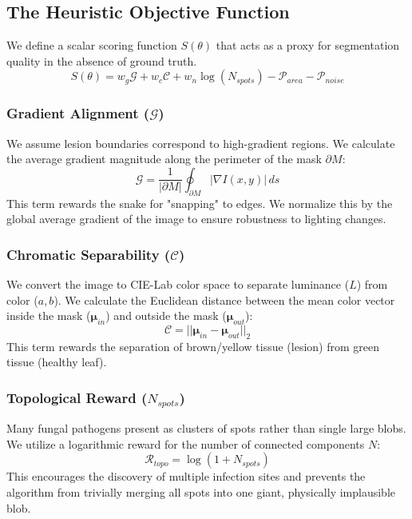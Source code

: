 \documentclass[journal]{IEEEtran}
\begin{document}
\subsection{The Heuristic Objective Function}
We define a scalar scoring function $S(\theta)$ that acts as a proxy for segmentation quality in the absence of ground truth.
\begin{equation}
S(\theta) = w_g \mathcal{G} + w_c \mathcal{C} + w_n \log(N_{spots}) - \mathcal{P}_{area} - \mathcal{P}_{noise}
\end{equation}

\subsubsection{Gradient Alignment ($\mathcal{G}$)}
We assume lesion boundaries correspond to high-gradient regions. We calculate the average gradient magnitude along the perimeter of the mask $\partial M$:
\begin{equation}
\mathcal{G} = \frac{1}{|\partial M|} \oint_{\partial M} |\nabla I(x,y)| \, ds
\end{equation}
This term rewards the snake for "snapping" to edges. We normalize this by the global average gradient of the image to ensure robustness to lighting changes.

\subsubsection{Chromatic Separability ($\mathcal{C}$)}
We convert the image to CIE-Lab color space to separate luminance ($L$) from color ($a, b$). We calculate the Euclidean distance between the mean color vector inside the mask ($\bm{\mu}_{in}$) and outside the mask ($\bm{\mu}_{out}$):
\begin{equation}
\mathcal{C} = || \bm{\mu}_{in} - \bm{\mu}_{out} ||_2
\end{equation}
This term rewards the separation of brown/yellow tissue (lesion) from green tissue (healthy leaf).

\subsubsection{Topological Reward ($N_{spots}$)}
Many fungal pathogens present as clusters of spots rather than single large blobs. We utilize a logarithmic reward for the number of connected components $N$:
\begin{equation}
\mathcal{R}_{topo} = \log(1 + N_{spots})
\end{equation}
This encourages the discovery of multiple infection sites and prevents the algorithm from trivially merging all spots into one giant, physically implausible blob.
\end{document}
